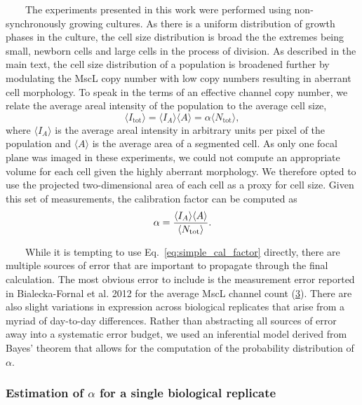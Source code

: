 ~~~~The
experiments
presented
in
this
work
were
performed
using
non-synchronously
growing
cultures.
As
there
is a
uniform
distribution
of
growth
phases
in the
culture,
the
cell
size
distribution
is
broad
the
the
extremes
being
small,
newborn
cells
and
large
cells
in the
process
of
division.
As
described
in the
main
text,
the
cell
size
distribution
of a
population
is
broadened
further
by
modulating
the
MscL
copy
number
with
low
copy
numbers
resulting
in
aberrant
cell
morphology.
To
speak
in the
terms
of an
effective
channel
copy
number,
we
relate
the
average
areal
intensity
of the
population
to the
average
cell
size,
\begin{equation}
\langle I_\text{tot} \rangle = \langle I_A \rangle \langle A \rangle = \alpha \langle N_\text{tot} \rangle,
\label{eq:area_conversion}\end{equation}
where
\(\langle I_A\rangle\)
is the
average
areal
intensity
in
arbitrary
units
per
pixel
of the
population
and
\(\langle A \rangle\)
is the
average
area
of a
segmented
cell.
As
only
one
focal
plane
was
imaged
in
these
experiments,
we
could
not
compute
an
appropriate
volume
for
each
cell
given
the
highly
aberrant
morphology.
We
therefore
opted
to use
the
projected
two-dimensional
area
of
each
cell
as a
proxy
for
cell
size.
Given
this
set of
measurements,
the
calibration
factor
can be
computed
as
\begin{equation}
\alpha = {\langle I_A \rangle\langle A \rangle \over \langle N_\text{tot} \rangle}.
\label{eq:simple_cal_factor}\end{equation}

~~~~While
it is
tempting
to use
Eq.~\ref{eq:simple_cal_factor}
directly,
there
are
multiple
sources
of
error
that
are
important
to
propagate
through
the
final
calculation.
The
most
obvious
error
to
include
is the
measurement
error
reported
in
Bialecka-Fornal
et al.
2012
for
the
average
MscL
channel
count
(\protect\hyperlink{ref-bialecka-fornal2012}{3}).
There
are
also
slight
variations
in
expression
across
biological
replicates
that
arise
from a
myriad
of
day-to-day
differences.
Rather
than
abstracting
all
sources
of
error
away
into a
systematic
error
budget,
we
used
an
inferential
model
derived
from
Bayes'
theorem
that
allows
for
the
computation
of the
probability
distribution
of
\(\alpha\).

\subsubsection{\texorpdfstring{Estimation
of
\(\alpha\)
for a
single
biological
replicate}{Estimation of \textbackslash{}alpha for a single biological replicate}}\label{estimation-of-alpha-for-a-single-biological-replicate}

